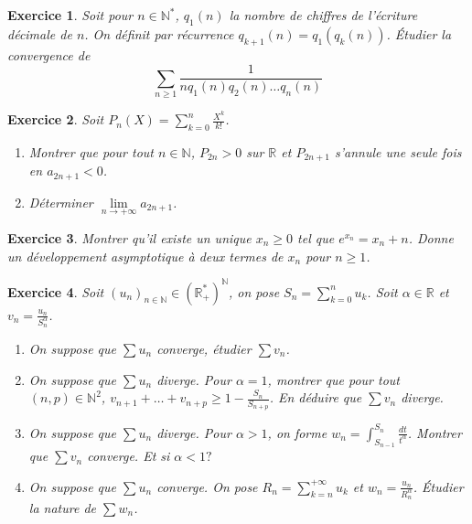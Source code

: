 \documentclass[12pt]{article}
\newtheorem{exercise}{Exercice}[section]
\theoremstyle{remark}
\theoremstyle{remark}
\newcommand{\R}{\mathbb{R}}
\newcommand{\N}{\mathbb{N}}
\begin{document}
\begin{exercise}
	Soit pour $n\in\N^{*}$, $q_{1}(n)$ la nombre de chiffres de l'écriture
	décimale de $n$. On définit par récurrence $q_{k+1}(n)=q_{1}(q_{k}(n))$.
	Étudier la convergence de 
	$$\sum_{n\geqslant1}\frac{1}{nq_{1}(n)q_{2}(n)\dots q_{n}(n)}$$
\end{exercise}

\begin{exercise}
	Soit $P_{n}(X)=\sum_{k=0}^{n}\frac{X^{k}}{k!}$.
	\begin{enumerate}
		\item Montrer que pour tout $n\in\N$, $P_{2n}>0$ sur $\R$ et $P_{2n+1}$
		s'annule une seule fois en $a_{2n+1}<0$.
		\item Déterminer $\lim\limits_{n\to+\infty}a_{2n+1}$.
	\end{enumerate}
\end{exercise}

\begin{exercise}
	Montrer qu'il existe un unique $x_{n}\geqslant0$ tel que
	$e^{x_{n}}=x_{n}+n$. Donne un développement asymptotique à deux termes de
	$x_{n}$ pour $n\geqslant1$.
\end{exercise}

\begin{exercise}
	Soit $(u_{n})_{n\in\N}\in(\R_{+}^{*})^{\N}$, on pose
	$S_{n}=\sum_{k=0}^{n}u_{k}$. Soit $\alpha\in\R$ et
	$v_{n}=\frac{u_{n}}{S_{n}^{\alpha}}$.
	\begin{enumerate}
		\item On suppose que $\sum u_{n}$ converge, étudier $\sum v_{n}$.
		\item On suppose que $\sum u_{n}$ diverge. Pour $\alpha=1$, montrer que
		pour tout $(n,p)\in\N^{2}$, $v_{n+1}+\dots+v_{n+p}\geqslant
		1-\frac{S_{n}}{S_{n+p}}$. En déduire que $\sum v_{n}$ diverge.
		\item On suppose que $\sum u_{n}$ diverge. Pour $\alpha>1$, on forme
		$w_{n}=\int_{S_{n-1}}^{S_{n}}\frac{dt}{t^{\alpha}}$. Montrer que $\sum
		v_{n}$ converge. Et si $\alpha<1 ?$
		\item On suppose que $\sum u_{n}$ converge. On pose
		$R_{n}=\sum_{k=n}^{+\infty}u_{k}$ et
		$w_{n}=\frac{u_{n}}{R_{n}^{\alpha}}$. Étudier la nature de $\sum w_{n}$.
	\end{enumerate}
\end{exercise}
\end{document}
